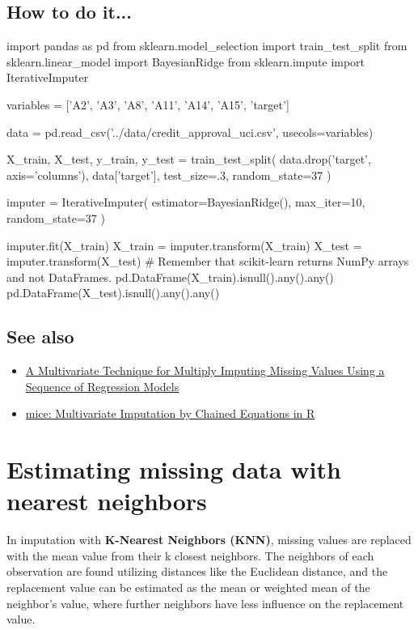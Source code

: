 \subsection{How to do it...}
\begin{pyc}
import pandas as pd
from sklearn.model_selection import train_test_split
from sklearn.linear_model import BayesianRidge
from sklearn.impute import IterativeImputer

variables = ['A2', 'A3', 'A8', 'A11', 'A14', 'A15', 'target']

data = pd.read_csv('../data/credit_approval_uci.csv',
                   usecols=variables)

X_train, X_test, y_train, y_test = train_test_split(
    data.drop('target', axis='columns'), data['target'],
    test_size=.3, random_state=37
)

imputer = IterativeImputer(
    estimator=BayesianRidge(),
    max_iter=10, random_state=37
)

imputer.fit(X_train)
X_train = imputer.transform(X_train)
X_test = imputer.transform(X_test)
# Remember that scikit-learn returns NumPy arrays and not DataFrames.
pd.DataFrame(X_train).isnull().any().any()
pd.DataFrame(X_test).isnull().any().any()
\end{pyc}
\subsection{See also}

\begin{itemize}
    \item \href{https://www.researchgate.net/publication/244959137_A_Multivariate_Technique_for_Multiply_Imputing_Missing_Values_Using_a_Sequence_of_Regression_Models}{A Multivariate Technique for Multiply Imputing Missing Values Using a Sequence of Regression Models}
    \item \href{https://www.jstatsoft.org/article/view/v045i03}{mice: Multivariate Imputation by Chained Equations in R}
\end{itemize}

\section{Estimating missing data with nearest neighbors}
In imputation with \textbf{K-Nearest Neighbors (KNN)}, missing values are replaced with the mean value from their k closest neighbors. The neighbors of each observation are found utilizing distances like the Euclidean distance, and the replacement value can be estimated as the mean or weighted mean of the neighbor's value, where further neighbors have less influence on the replacement value.
